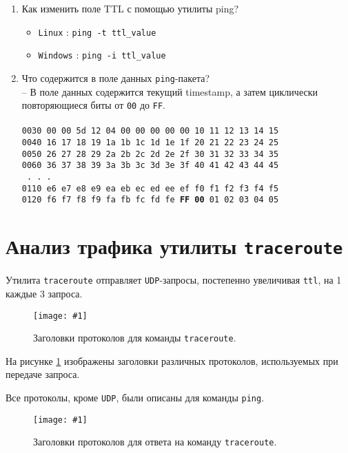 \documentclass[12pt, a4paper]{article}
\newcommand{\figc}[4]{
  \begin{figure}[h]
  \begin{center}
    \texttt{[image: \#1]}
    \caption{#2}
    \label{fig:#3}
  \end{center}
  \end{figure}
}
\begin{document}
\begin{enumerate}
  \item Как изменить поле TTL с помощью утилиты ping?\\
    \begin{itemize}
      \item \texttt{Linux} : \texttt{ping -t ttl\_value}
      \item \texttt{Windows} : \texttt{ping -i ttl\_value}
    \end{itemize}
  \item Что содержится в поле данных \texttt{ping}-пакета?\\
    -- В поле данных содержится текущий timestamp, а затем циклически
    повторяющиеся биты от \texttt{00} до \texttt{FF}.\\ \\
    \texttt{0030   00 00 5d 12 04 00 00 00 00 00 10 11 12 13 14 15}\\
    \texttt{0040   16 17 18 19 1a 1b 1c 1d 1e 1f 20 21 22 23 24 25}\\
    \texttt{0050   26 27 28 29 2a 2b 2c 2d 2e 2f 30 31 32 33 34 35}\\
    \texttt{0060   36 37 38 39 3a 3b 3c 3d 3e 3f 40 41 42 43 44 45}\\
    \texttt{                    .       .       .                 }\\
    \texttt{0110   e6 e7 e8 e9 ea eb ec ed ee ef f0 f1 f2 f3 f4 f5}\\
    \texttt{0120   f6 f7 f8 f9 fa fb fc fd fe \textbf{FF 00} 01 02 03 04 05}\\
\end{enumerate}

\section{Анализ трафика утилиты \texttt{traceroute}}

Утилита \texttt{traceroute} отправляет \texttt{UDP}-запросы, постепенно увеличивая
\texttt{ttl}, на 1 каждые 3 запроса.

\figc{trace_headers}{Заголовки протоколов для команды \texttt{traceroute}.}{t_f}{3.0}

На рисунке \ref{fig:t_f} изображены заголовки различных протоколов, используемых при
передаче запроса.

Все протоколы, кроме \texttt{UDP}, были описаны для команды \texttt{ping}.

\figc{trace_ans_headers}{Заголовки протоколов для ответа на команду \texttt{traceroute}.}{t_f_a}{3.0}
\end{document}
